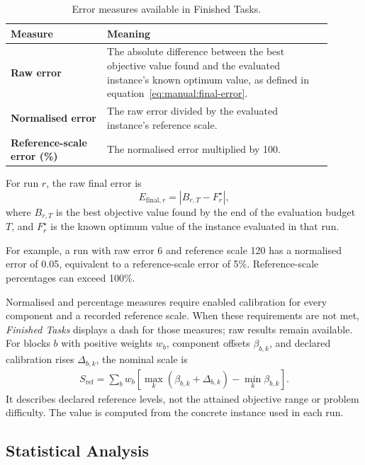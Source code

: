 \documentclass[journal,onecolumn]{IEEEtran}
\begin{document}
\begin{table}[H]
\centering
\small
\caption{Error measures available in Finished Tasks.}
\label{tab:manual:finished-task-fields}
\begin{tabular}{@{}p{0.27\linewidth}p{0.63\linewidth}@{}}
\toprule
\textbf{Measure} & \textbf{Meaning} \\
\midrule
\textbf{Raw error} & The absolute difference between the best objective value found and the evaluated instance's known optimum value, as defined in equation~\eqref{eq:manual:final-error}. \\
\textbf{Normalised error} & The raw error divided by the evaluated instance's reference scale. \\
\textbf{Reference-scale error (\%)} & The normalised error multiplied by 100. \\
\bottomrule
\end{tabular}
\end{table}

For run \(r\), the raw final error is
\begin{equation}
E_{\mathrm{final},r}=\left|B_{r,T}-F_r^\star\right|,
\label{eq:manual:final-error}
\end{equation}
where \(B_{r,T}\) is the best objective value found by the end of the evaluation budget \(T\), and \(F_r^\star\) is the known optimum value of the instance evaluated in that run.

For example, a run with raw error 6 and reference scale 120 has a normalised error of 0.05, equivalent to a reference-scale error of 5\%. Reference-scale percentages can exceed 100\%.

Normalised and percentage measures require enabled calibration for every component and a recorded reference scale. When these requirements are not met, \emph{Finished Tasks} displays a dash for those measures; raw results remain available. For blocks $b$ with positive weights $w_b$, component offsets $\beta_{b,k}$, and declared calibration rises $\Delta_{b,k}$, the nominal scale is
\begin{align}
S_{\mathrm{ref}}=\sum_b w_b\left[\max_k(\beta_{b,k}+\Delta_{b,k})-\min_k\beta_{b,k}\right].
\end{align}
It describes declared reference levels, not the attained objective range or problem difficulty. The value is computed from the concrete instance used in each run.

\subsection{Statistical Analysis}
\label{ssec:manual:experimental-statistical-analysis}
\end{document}
